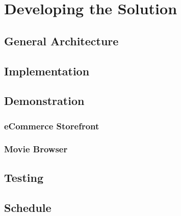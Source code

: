 \chapter{Developing the Solution}

\section{General Architecture}
\section{Implementation}
\section{Demonstration}
\subsection{eCommerce Storefront}
\subsection{Movie Browser}
\section{Testing}
\section{Schedule}